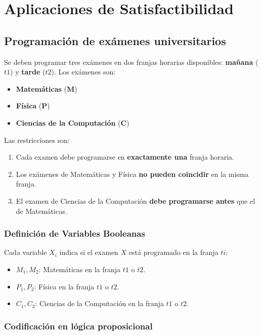 

\section{Aplicaciones de Satisfactibilidad}
\subsection{Programación de exámenes universitarios}
Se deben programar tres exámenes en dos franjas horarias disponibles: \textbf{mañana} (\(t1\)) y \textbf{tarde} (\(t2\)). Los exámenes son:

\begin{itemize}
    \item \textbf{Matemáticas} (\(\boldsymbol{M}\))
    \item \textbf{Física} (\(\boldsymbol{P}\))
    \item \textbf{Ciencias de la Computación} (\(\boldsymbol{C}\))
\end{itemize}

Las restricciones son:
\begin{enumerate}
    \item Cada examen debe programarse en \textbf{exactamente una} franja horaria.
    \item Los exámenes de Matemáticas y Física \textbf{no pueden coincidir} en la misma franja.
    \item El examen de Ciencias de la Computación \textbf{debe programarse antes} que el de Matemáticas.
\end{enumerate}

\subsubsection*{Definición de Variables Booleanas}
Cada variable \( X_i \) indica si el examen \( X \) está programado en la franja \( ti \):

\begin{itemize}
    \item \( M_{1}, M_{2} \): Matemáticas en la franja $t1$ o $t2$.
    \item \( P_{1}, P_{2} \): Física en la franja $t1$ o $t2$.
    \item \( C_{1}, C_{2} \): Ciencias de la Computación en la franja $t1$ o $t2$.
\end{itemize}

\subsubsection*{Codificación en lógica proposicional}

